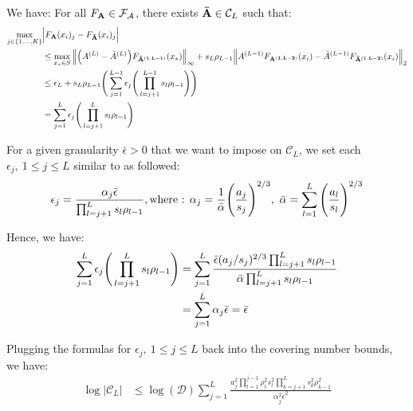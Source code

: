 \noindent We have: For all $F_{\bf A}\in\mathcal{F}_\mathcal{A}$, there exists ${\bf \bar A}\in\mathcal{C}_L$ such that:
\begin{align*}
    \max_{j\in\{1, \dots, K\}} &\Big| 
        F_{\bf A}(x_i)_j - F_{\bf \bar A}(x_i)_j
     \Big| \\
    &\le \max_{x_*\in S}\Big\|
        \Big( A^{(L)}-{\bar A}^{(L)} \Big)F_{\bf {\bar A}^{(1, L-1)}}(x_*)
    \Big\|_\infty + s_L\rho_{L-1} \Big\|
        A^{(L-1)}F_{\bf A^{(1, L-2)}}(x_i) - {\bar A}^{(L-1)}F_{\bf {\bar A}^{(1, L-2)}}(x_i) 
    \Big\|_2 \\ 
    &\le \epsilon_L + s_L\rho_{L-1}\Bigg( 
        \sum_{j=1}^{L-1}\epsilon_j\Bigg( 
            \prod_{l=j+1}^{L-1}s_l\rho_{l-1}
         \Bigg)
     \Bigg) \\
    &=\sum_{j=1}^L \epsilon_j\Bigg( \prod_{l=j+1}^L s_l\rho_{l-1} \Bigg)
\end{align*}

\noindent For a given granularity $\bar \epsilon > 0$ that we want to impose on $\mathcal{C}_L$, we set each $\epsilon_j, \ 1 \le j \le L$ similar to \cite{article:bartlett} as followed:
\begin{align*}
    \epsilon_j = \frac{\alpha_j\bar\epsilon}{\prod_{l=j+1}^L s_l\rho_{l-1}}, \text{where : } \alpha_j = \frac{1}{\bar\alpha}\biggRound{\frac{a_j}{s_j}}^{2/3}, \ \bar\alpha=\sum_{l=1}^L \biggRound{\frac{a_l}{s_l}}^{2/3}
\end{align*}

\noindent Hence, we have:
\begin{align*}
    \sum_{j=1}^L \epsilon_j\Bigg( 
        \prod_{l=j+1}^L s_l\rho_{l-1}
     \Bigg) &= \sum_{j=1}^L \frac{\bar\epsilon(a_j/s_j)^{2/3}\prod_{l=j+1}^L s_l\rho_{l-1}}{\bar\alpha\prod_{l=j+1}^Ls_l\rho_{l-1}} \\
    &= \sum_{j=1}^L\alpha_j\bar\epsilon = \bar\epsilon
\end{align*}

\noindent Plugging the formulas for $\epsilon_j, \ 1\le j \le L$ back into the covering number bounds, we have:
\begin{align*}
    \log|\mathcal{C}_L| &\le \log(\mathcal{D})\sum_{j=1}^L \frac{a_j^2\prod_{l=1}^{j-1}\rho_l^2s_l^2\prod_{k=j+1}^L s_k^2\rho_{k-1}^2}{\alpha_j^2\bar\epsilon^2}
\end{align*}

